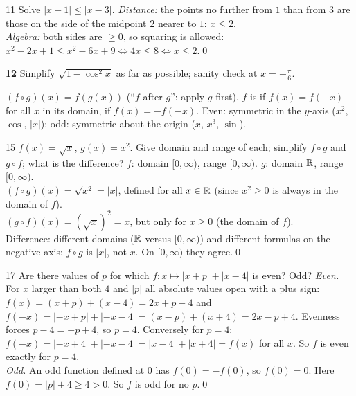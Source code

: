 \begin{bookex}{11}
Solve $|x-1|\le|x-3|$.
\solution
\emph{Distance:} the points no further from $1$ than from $3$ are those on the side of the midpoint $2$ nearer to $1$: $x\le2$.\\
\emph{Algebra:} both sides are $\ge0$, so squaring is allowed: $x^2-2x+1\le x^2-6x+9\Leftrightarrow4x\le8\Leftrightarrow x\le2$.\qed
\end{bookex}

\begin{trybox}[{12}]
\textbf{12} Simplify $\sqrt{1-\cos^2x}$ as far as possible; sanity check at $x=-\frac\pi6$.
\end{trybox}

\begin{key}
$(f\circ g)(x)=f(g(x))$ (``$f$ after $g$'': apply $g$ first). $f$ is  if $f(x)=f(-x)$ for all $x$ in its domain,  if $f(x)=-f(-x)$. Even: symmetric in the $y$-axis ($x^2$, $\cos$, $|x|$); odd: symmetric about the origin ($x$, $x^3$, $\sin$).
\end{key}

\begin{bookex}{15}
$f(x)=\sqrt x$, $g(x)=x^2$. Give domain and range of each; simplify $f\circ g$ and $g\circ f$; what is the difference?
\solution
$f$: domain $[0,\infty)$, range $[0,\infty)$. $g$: domain $\mathbb{R}$, range $[0,\infty)$.\\
$(f\circ g)(x)=\sqrt{x^2}=|x|$, defined for all $x\in\mathbb{R}$ (since $x^2\ge0$ is always in the domain of $f$).\\
$(g\circ f)(x)=(\sqrt x)^2=x$, but only for $x\ge0$ (the domain of $f$).\\
Difference: different domains ($\mathbb{R}$ versus $[0,\infty)$) and different formulas on the negative axis: $f\circ g$ is $|x|$, not $x$. On $[0,\infty)$ they agree.\qed
\end{bookex}

\begin{bookex}{17}
Are there values of $p$ for which $f:x\mapsto|x+p|+|x-4|$ is even? Odd?
\solution
\emph{Even.} For $x$ larger than both $4$ and $|p|$ all absolute values open with a plus sign: $f(x)=(x+p)+(x-4)=2x+p-4$ and $f(-x)=|{-x}+p|+|{-x}-4|=(x-p)+(x+4)=2x-p+4$. Evenness forces $p-4=-p+4$, so $p=4$. Conversely for $p=4$: $f(-x)=|{-x}+4|+|{-x}-4|=|x-4|+|x+4|=f(x)$ for all $x$. So $f$ is even exactly for $p=4$.\\
\emph{Odd.} An odd function defined at $0$ has $f(0)=-f(0)$, so $f(0)=0$. Here $f(0)=|p|+4\ge4>0$. So $f$ is odd for no $p$.\qed
\end{bookex}

